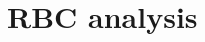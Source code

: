 \documentclass[final,a4paper,12pt,english]{UnicaPhdThesis3}
\begin{document}
%

\chapter{RBC analysis}
\end{document}
